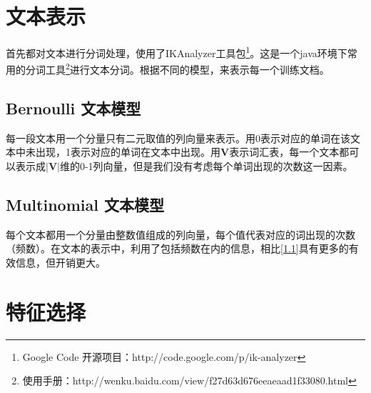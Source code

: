 \documentclass[11pt]{article}
\begin{document}
\section{文本表示}
\hspace{1.6em} 首先都对文本进行分词处理，使用了IKAnalyzer工具包\footnote{Google Code 开源项目：http://code.google.com/p/ik-analyzer}。这是一个java环境下常用的分词工具\footnote{使用手册：http://wenku.baidu.com/view/f27d63d676eeaeaad1f33080.html}进行文本分词。根据不同的模型，来表示每一个训练文档。
\subsection{Bernoulli 文本模型}\label{bernoulli}
\hspace{1.6em} 每一段文本用一个分量只有二元取值的列向量来表示。用0表示对应的单词在该文本中未出现，1表示对应的单词在文本中出现。用$\mathbf{V}$表示词汇表，每一个文本都可以表示成$|\mathbf{V}|$维的0-1列向量，但是我们没有考虑每个单词出现的次数这一因素。
\subsection{Multinomial 文本模型}
\hspace{1.6em} 每个文本都用一个分量由整数值组成的列向量，每个值代表对应的词出现的次数（频数）。在文本的表示中，利用了包括频数在内的信息，相比[\ref{bernoulli}]具有更多的有效信息，但开销更大。
\section{特征选择}
\end{document}
